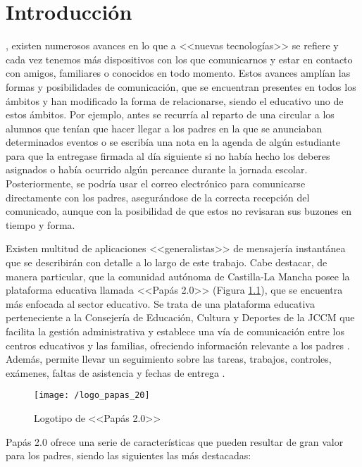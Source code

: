 \chapter{Introducción}
\label{chap:intro}

, existen numerosos avances en lo que a <<nuevas tecnologías>> se refiere y cada vez tenemos más dispositivos con los que comunicarnos y estar en contacto con amigos, familiares o conocidos en todo momento. Estos avances amplían las formas y posibilidades de comunicación, que se encuentran presentes en todos los ámbitos y han modificado la forma de relacionarse, siendo el educativo uno de estos ámbitos. Por ejemplo, antes se recurría al reparto de una circular a los alumnos que tenían que hacer llegar a los padres en la que se anunciaban determinados eventos o se escribía una nota en la agenda de algún estudiante para que la entregase firmada al día siguiente si no había hecho los deberes asignados o había ocurrido algún percance durante la jornada escolar. Posteriormente, se podría usar el correo electrónico para comunicarse directamente con los padres, asegurándose de la correcta recepción del comunicado, aunque con la posibilidad de que estos no revisaran sus buzones en tiempo y forma.

Existen multitud de aplicaciones <<generalistas>> de mensajería instantánea que se describirán con detalle a lo largo de este trabajo. Cabe destacar, de manera particular, que la comunidad autónoma de Castilla-La Mancha posee la plataforma educativa llamada <<Papás 2.0>> (Figura \ref{fig:papas20}), que se encuentra más enfocada al sector educativo. Se trata de una plataforma educativa perteneciente a la Consejería de Educación, Cultura y Deportes de la \acf{JCCM} que facilita la gestión administrativa y establece una vía de comunicación entre los centros educativos y las familias, ofreciendo información relevante a los padres \cite{JCCM2017}. Además, permite llevar un seguimiento sobre las tareas, trabajos, controles, exámenes, faltas de asistencia y fechas de entrega \cite{JCCM2010}.

\begin{figure}[!h]
	\begin{center}
		\texttt{[image: /logo\_papas\_20]}
		\caption{Logotipo de <<Papás 2.0>>}
		\label{fig:papas20}
	\end{center}
\end{figure}

\newpage

Papás 2.0 ofrece una serie de características que pueden resultar de gran valor para los padres, siendo las siguientes las más destacadas:

